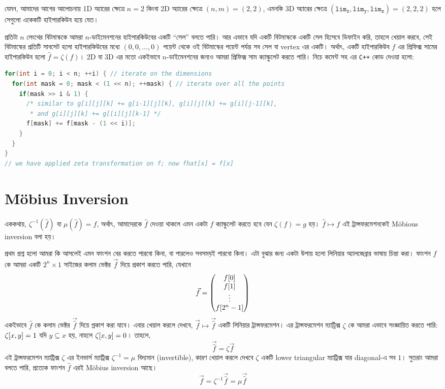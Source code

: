 যেমন, আমাদের আগের আলোচনায় 1D অ্যারের ক্ষেত্রে $n=2$ কিংবা 2D অ্যারের ক্ষেত্রে
$(n,m) = (2,2)$, এমনকি 3D অ্যারের ক্ষেত্রে $(\mathtt{lim_x}, \mathtt{lim_y},
\mathtt{lim_z}) = (2,2,2)$ হলে সেগুলো একেকটি হাইপারকিউব হয়ে যেত।

প্রতিটা $n$ লেংথের বিটমাস্ককে আমরা $n$-ডাইমেনশনের হাইপারকিউবের একটি ``সেল''
বলতে পারি। আর এভাবে যদি একটি বিটমাস্ককে একটি সেল হিসেবে ডিফাইন করি, তাহলে
খেয়াল করবে, সেই বিটমাস্কের প্রতিটি সাবসেট হলো হাইপারকিউবের মধ্যে $(0, 0,
\ldots, 0)$ পয়েন্ট থেকে ওই বিটমাস্কের পয়েন্ট পর্যন্ত সব সেল বা vertex এর
একটি। অর্থাৎ, একটি হাইপারকিউব $f$ এর প্রিফিক্স সামের হাইপারকিউব হলো $\hat{f}
= \zeta(f)$। 2D বা 3D এর মতো একইভাবে $n$-ডাইমেনশনের জন্যও আমরা প্রিফিক্স সাম
ক্যাল্কুলেট করতে পারি। নিচে কমেন্ট সহ এর \texttt{C++} কোড দেওয়া হলো:
\begin{lstlisting}[language=C++]
for(int i = 0; i < n; ++i) { // iterate on the dimensions
  for(int mask = 0; mask < (1 << n); ++mask) { // iterate over all the points
    if(mask >> i & 1) {
      /* similar to g[i][j][k] += g[i-1][j][k], g[i][j][k] += g[i][j-1][k],
       * and g[i][j][k] += g[[i][j][k-1] */
      f[mask] += f[mask - (1 << i)];
    }
  }
}
// we have applied zeta transformation on f; now fhat[x] = f[x]
\end{lstlisting}

\section{M{\"o}bius Inversion}
এককথায়, $\zeta^{-1}(\hat{f})$ বা $\mu(\hat{f}) = f$, অর্থাৎ, আমাদেরকে
$\hat{f}$ দেওয়া থাকলে এমন
একটা $f$ ক্যাল্কুলেট করতে হবে যেন $\zeta(f) = g$ হয়। $\hat{f} \mapsto f$ এই
ট্রান্সফরমেশনকেই M{\"o}bious inversion বলা হয়।

প্রথম প্রশ্ন হলো আমরা কি আসলেই এমন ফাংশন বের করতে পারবো কিনা, বা পারলেও
সবসময়ই পারবো কিনা। এটা বুঝার জন্য একটা উপায় হলো লিনিয়ার অ্যালজেব্রার ভাষায়
চিন্তা করা। ফাংশন $f$ কে আমরা একটি $2^n \times 1$ সাইজের কলাম ভেক্টর
$\vec{f}$ দিয়ে প্রকাশ করতে পারি, যেখানে 
\[
  \vec{f} =
  \begin{pmatrix}
    f[0]\\
    f[1]\\
    \vdots\\
    f[2^n-1]
  \end{pmatrix}
\]
একইভাবে $\hat{f}$ কে কলাম ভেক্টর $\vec{\hat{f}}$ দিয়ে প্রকাশ করা যাবে।
এবার খেয়াল করলে দেখবে, $\vec{f} \mapsto \vec{\hat{f}}$ একটি লিনিয়ার
ট্রান্সফরমেশন। এর
ট্রান্সফরমেশন ম্যাট্রিক্স $\zeta$ কে আমরা এভাবে সংজ্ঞায়িত করতে পারি:
$\zeta[x, y] = 1$ যদি $y \subseteq x$ হয়, নাহলে $\zeta[x, y] = 0$।
তাহলে,
\[
  \vec{\hat{f}} = \zeta \vec{f}
\]
এই ট্রান্সফরমেশন ম্যাট্রিক্স $\zeta$ এর ইনভার্স ম্যাট্রিক্স $\zeta^{-1} =
\mu$ বিদ্যমান
(invertible), কারণ খেয়াল করলে দেখবে $\zeta$ একটি lower triangular
ম্যাট্রিক্স যার diagonal-এ সব $1$। সুতরাং আমরা বলতে পারি, প্রত্যেক ফাংশন
$\hat{f}$ এরই M{\"o}bius inversion আছে।
\[
  \vec{f} = \zeta^{-1}\vec{\hat{f}} = \mu\vec{\hat{f}}
\]

